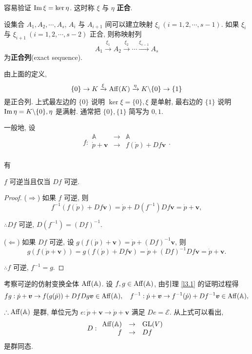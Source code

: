 \documentclass{ctexart}
\begin{document}
容易验证 $\operatorname{Im} \xi=\ker\eta$. 这时称 $\xi$ 与 $\eta$ \textbf{正合}.
\begin{definition}
    设集合 $A_1,A_2,\cdots,A_s$, $A_i$ 与 $A_{i+1}$ 间可以建立映射 $\xi_i\ (i=1,2,\cdots,s-1)$. 如果 $\xi_i$ 与 $\xi_{i+1}\ (i=1,2,\cdots,s-2)$ 正合, 则称映射列
    \[A_1\xrightarrow{\xi_1}A_2\xrightarrow{\xi_2}\cdots\xrightarrow{\xi_{s-1}}A_s\]
    为\textbf{正合列}(exact sequence).
\end{definition}
由上面的定义,
\[\{0\}\to K\xrightarrow{\xi}\operatorname{Aff} (K)\xrightarrow{\eta}K\backslash\{0\}\to\{1\}\]
是正合列. 上式最左边的 $\{0\}$ 说明 $\ker\xi=\{0\},\xi$ 是单射, 最右边的 $\{1\}$ 说明 $\operatorname{Im} \eta=K\backslash\{0\},\eta$ 是满射. 通常把 $\{0\},\{1\}$ 简写为 $0,1$.

一般地, 设
\[f:\begin{array}{rcl}
    \mathbb{A} & \to & \mathbb{A} \\
    \dot{p}+\boldsymbol{v} & \to & f(\dot{p})+Df\boldsymbol{v} \\
\end{array}.\]

有
\begin{lemma}\label{l3.1}
    $f$ 可逆当且仅当 $Df$ 可逆.
\end{lemma}
\begin{proof}
    ($\Rightarrow$) 如果 $f$ 可逆, 则
    \[f^{-1}(f(\dot{p})+Df\boldsymbol{v})=\dot{p}+D(f^{-1})Df\boldsymbol{v}=\dot{p}+\boldsymbol{v},\]

    $\therefore Df$ 可逆, $D(f^{-1})=(Df)^{-1}$.

    ($\Leftarrow$) 如果 $Df$ 可逆, 设 $g(f(\dot{p})+\boldsymbol{v})=\dot{p}+(Df)^{-1}\boldsymbol{v}$, 则
    \[g(f(\dot{p}+\boldsymbol{v}))=g(f(\dot{p})+Df\boldsymbol{v})=\dot{p}+(Df)^{-1}Df\boldsymbol{v}=\dot{p}+\boldsymbol{v}.\]

    $\therefore f$ 可逆, $f^{-1}=g$.
\end{proof}
考察可逆的仿射变换全体 $\operatorname{Aff} (\mathbb{A})$. 设 $f,g\in\operatorname{Aff} (\mathbb{A})$, 由引理 \ref{l3.1} 的证明过程得
\[fg:\dot{p}+\boldsymbol{v}\to f(g(\dot{p}))+DfDg\boldsymbol{v}\in\operatorname{Aff} (\mathbb{A}),\quad f^{-1}:\dot{p}+\boldsymbol{v}\to f^{-1}(\dot{p})+Df^{-1}\boldsymbol{v}\in\operatorname{Aff} (\mathbb{A}),\]

$\therefore\operatorname{Aff} (\mathbb{A})$ 是群, 单位元为 $e:\dot{p}+\boldsymbol{v}\to\dot{p}+\boldsymbol{v}$ 满足 $De=\mathcal{E}$. 从上式可以看出,
\[D:\begin{array}{rcl}
    \operatorname{Aff} (\mathbb{A}) & \to & \operatorname{GL} (V) \\
    f & \to & Df \\
\end{array}\]
是群同态.
\end{document}
